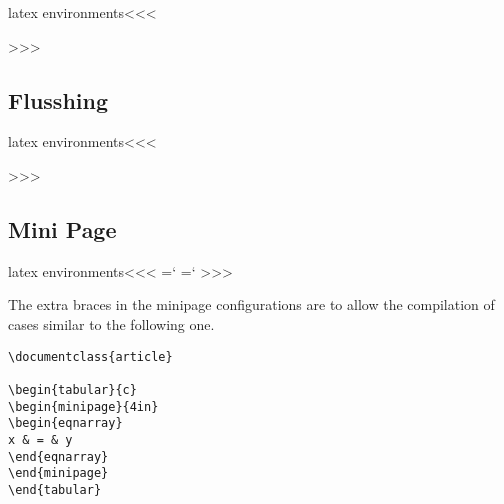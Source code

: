 \<latex environments\><<<
  {\EndP}{\par \ShowPar} {}{}
   {\IgnorePar\EndP{}\par\ShowPar}
   {\IgnorePar\EndP{}\par\ShowPar}
   {} {\par\ShowPar}
>>>

\subsection{Flusshing}

\<latex environments\><<<
  {\EndP}{\par \ShowPar} {}{}
  {\EndP}{\par \ShowPar} {}{}
  {\IgnorePar\EndP{}\par\ShowPar}
  {\IgnorePar\EndP{}\par\ShowPar}
  {} {\par\ShowPar}
  {\IgnorePar\EndP{}\par\ShowPar}
  {\IgnorePar\EndP{}\par\ShowPar}
  {} {\par\ShowPar}
>>>

\subsection{Mini Page}

\<latex environments\><<<
   {%
    {=`}\fi
   }
   {=`{\fi}%
   }
   {}{}
>>>

The extra braces in the minipage configurations are to allow the
compilation of cases similar to the following one.

\begin{verbatim}
\documentclass{article}  
    
\begin{tabular}{c}  
\begin{minipage}{4in}  
\begin{eqnarray}  
x & = & y  
\end{eqnarray}  
\end{minipage}  
\end{tabular}    
  
\end{verbatim}





